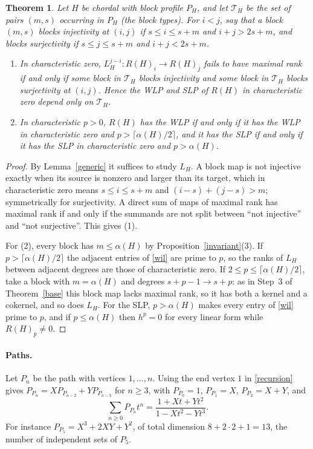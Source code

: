 \documentclass[11pt,a4paper]{article}
\newtheorem{theorem}{Theorem}[section]
\theoremstyle{definition}
\begin{document}
\begin{theorem}\label{chordalcrit}
Let $H$ be chordal with block profile $P_H$, and let $\mathcal T_H$ be the set of pairs $(m,s)$ occurring in $P_H$ (the \emph{block types}). For $i<j$, say that a block $(m,s)$ \emph{blocks injectivity} at $(i,j)$ if $s\le i\le s+m$ and $i+j>2s+m$, and \emph{blocks surjectivity} if $s\le j\le s+m$ and $i+j<2s+m$.
\begin{enumerate}
\item In characteristic zero, $L_H^{j-i}:R(H)_i\to R(H)_j$ fails to have maximal rank if and only if some block in $\mathcal T_H$ blocks injectivity and some block in $\mathcal T_H$ blocks surjectivity at $(i,j)$. Hence the WLP and SLP of $R(H)$ in characteristic zero depend only on $\mathcal T_H$.
\item In characteristic $p>0$, $R(H)$ has the WLP if and only if it has the WLP in characteristic zero and $p>\lceil\alpha(H)/2\rceil$, and it has the SLP if and only if it has the SLP in characteristic zero and $p>\alpha(H)$.
\end{enumerate}
\end{theorem}
\begin{proof}
By Lemma~\ref{generic} it suffices to study $L_H$. A block map is not injective exactly when its source is nonzero and larger than its target, which in characteristic zero means $s\le i\le s+m$ and $(i-s)+(j-s)>m$; symmetrically for surjectivity. A direct sum of maps of maximal rank has maximal rank if and only if the summands are not split between ``not injective'' and ``not surjective''. This gives (1).

For (2), every block has $m\le\alpha(H)$ by Proposition~\ref{invariant}(3). If $p>\lceil\alpha(H)/2\rceil$ the adjacent entries of \eqref{wil} are prime to $p$, so the ranks of $L_H$ between adjacent degrees are those of characteristic zero. If $2\le p\le\lceil\alpha(H)/2\rceil$, take a block with $m=\alpha(H)$ and degrees $s+p-1\to s+p$: as in Step~3 of Theorem~\ref{base} this block map lacks maximal rank, so it has both a kernel and a cokernel, and so does $L_H$. For the SLP, $p>\alpha(H)$ makes every entry of \eqref{wil} prime to $p$, and if $p\le\alpha(H)$ then $h^p=0$ for every linear form while $R(H)_p\ne0$.
\end{proof}

\paragraph{Paths.}
Let $P_n$ be the path with vertices $1,\dots,n$. Using the end vertex $1$ in \eqref{recursion} gives $P_{P_n}=XP_{P_{n-2}}+YP_{P_{n-3}}$ for $n\ge3$, with $P_{P_0}=1$, $P_{P_1}=X$, $P_{P_2}=X+Y$, and
\[
 \sum_{n\ge0}P_{P_n}t^n=\frac{1+Xt+Yt^2}{1-Xt^2-Yt^3}.
\]
For instance $P_{P_5}=X^3+2XY+Y^2$, of total dimension $8+2\cdot2+1=13$, the number of independent sets of $P_5$.
\end{document}
